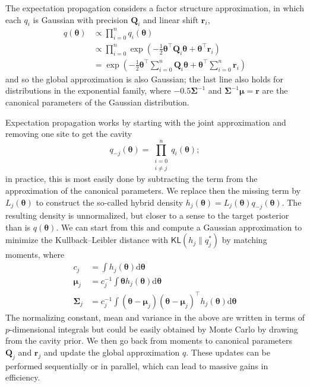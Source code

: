 \documentclass[
  11pt,
  letterpaper,
]{scrbook}
\theoremstyle{definition}
\theoremstyle{plain}
\theoremstyle{plain}
\theoremstyle{plain}
\theoremstyle{definition}
\theoremstyle{definition}
\theoremstyle{plain}
\theoremstyle{plain}
\theoremstyle{remark}
\begin{document}
The expectation propagation considers a factor structure approximation,
in which each \(q_i\) is Gaussian with precision \(\mathbf{Q}_i\) and
linear shift \(\boldsymbol{r}_i\), \begin{align*}
 q(\boldsymbol{\theta}) &\propto \prod_{i=0}^n q_i(\boldsymbol{\theta})
 \\& \propto \prod_{i=0}^n \exp \left(-\frac{1}{2} \boldsymbol{\theta}^\top\mathbf{Q}_i\boldsymbol{\theta} + \boldsymbol{\theta}^\top\boldsymbol{r}_i\right)
 \\ &= \exp \left( - \frac{1}{2} \boldsymbol{\theta}^\top \sum_{i=0}^n\mathbf{Q}_i\boldsymbol{\theta} + \boldsymbol{\theta}^\top \sum_{i=0}^n\boldsymbol{r}_i\right)
\end{align*} and so the global approximation is also Gaussian; the last
line also holds for distributions in the exponential family, where
\(-0.5\boldsymbol{\Sigma}^{-1}\) and
\(\boldsymbol{\Sigma}^{-1}\boldsymbol{\mu} = \boldsymbol{r}\) are the
canonical parameters of the Gaussian distribution.

Expectation propagation works by starting with the joint approximation
and removing one site to get the cavity
\[q_{-j}(\boldsymbol{\theta}) = \prod_{\substack{i = 0\\i \neq j}}^n q_{i}(\boldsymbol{\theta});\]
in practice, this is most easily done by subtracting the term from the
approximation of the canonical parameters. We replace then the missing
term by \(L_j(\boldsymbol{\theta})\) to construct the so-called hybrid
density
\(h_j(\boldsymbol{\theta}) = L_j(\boldsymbol{\theta})q_{-j}(\boldsymbol{\theta}).\)
The resulting density is unnormalized, but closer to a sense to the
target posterior than is \(q(\boldsymbol{\theta}).\) We can start from
this and compute a Gaussian approximation to minimize the
Kullback--Leibler distance with \(\mathsf{KL}(h_j \parallel q^*_j)\) by
matching moments, where \begin{align*}
 c_j &= \int h_j(\boldsymbol{\theta}) \mathrm{d} \boldsymbol{\theta} \\
 \boldsymbol{\mu}_j &= c_{j}^{-1} \int \boldsymbol{\theta} h_j(\boldsymbol{\theta}) \mathrm{d} \boldsymbol{\theta}
 \\ \boldsymbol{\Sigma}_j &= c_j^{-1} \int (\boldsymbol{\theta} - \boldsymbol{\mu}_j)(\boldsymbol{\theta} - \boldsymbol{\mu}_j)^\top h_j(\boldsymbol{\theta}) \mathrm{d} \boldsymbol{\theta}
\end{align*} The normalizing constant, mean and variance in the above
are written in terms of \(p\)-dimensional integrals but could be easily
obtained by Monte Carlo by drawing from the cavity prior. We then go
back from moments to canonical parameters \(\mathbf{Q}_j\) and
\(\boldsymbol{r}_j\) and update the global approximation \(q.\) These
updates can be performed sequentially or in parallel, which can lead to
massive gains in efficiency.
\end{document}
